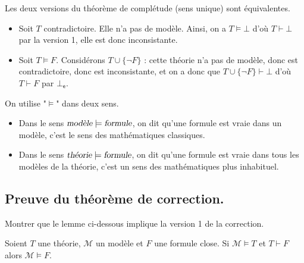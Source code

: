 \documentclass[./main]{subfiles}
\begin{document}
  \begin{prop}
    Les deux versions du théorème de complétude (sens unique) sont équivalentes.
  \end{prop}
  \begin{prv}
    \begin{itemize}
      \item Soit $T$ contradictoire. Elle n'a pas de modèle.
        Ainsi, on a $T \models \bot$ d'où $T \vdash \bot$ par la version 1, elle est donc inconsistante.
      \item Soit $T \models F$. Considérons $T \cup \{\lnot F\}$ : cette théorie n'a pas de modèle, donc est contradictoire, donc est inconsistante, et on a donc que $T \cup \{\lnot F\} \vdash \bot$ d'où $T \vdash F$ par $\bot_\mathsf{e}$.
    \end{itemize}
  \end{prv}

  \begin{rmk}
    On utilise "$\models$" dans deux sens.
    \begin{itemize}
      \item Dans le sens $\textsl{modèle} \models \textsl{formule}$, on dit qu'une formule est vraie dans un modèle, c'est le sens des mathématiques classiques.
      \item Dans le sens $\textsl{théorie} \models \textsl{formule}$, on dit qu'une formule est vraie dans tous les modèles de la théorie, c'est un sens des mathématiques plus inhabituel.
    \end{itemize}
  \end{rmk}

  \subsection{Preuve du théorème de correction.}

  \begin{exo}
    Montrer que le lemme ci-dessous implique la version 1 de la correction.
  \end{exo}

  \begin{lem}
    Soient $T$ une théorie, $\mathcal{M}$ un modèle et $F$ une formule close.
    Si $\mathcal{M} \models T$ et $T \vdash F$ alors $\mathcal{M} \models F$.
  \end{lem}
\end{document}
